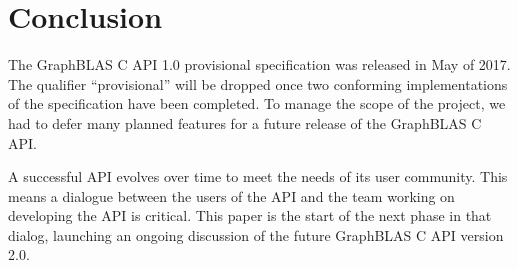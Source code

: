 %
%
\section{Conclusion}
\label{sec:conclusion}

The GraphBLAS C API 1.0 provisional specification was released in May of 2017.  The qualifier ``provisional'' will be dropped once
two conforming implementations of the specification have been completed.  To manage the scope of the project,
we had to defer many planned features for a future release of the GraphBLAS C API.  

A successful API evolves over time to meet the needs of its user community.   This means a dialogue
between the users of the API and the team working on developing the API is critical.  This paper is the start of the next
phase in that dialog, launching an ongoing discussion of the future GraphBLAS C API version 2.0.
